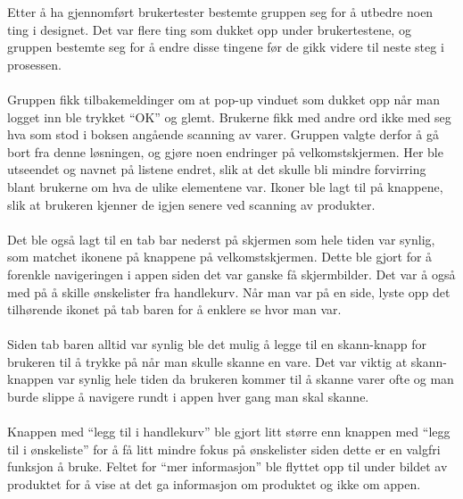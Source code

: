 Etter å ha gjennomført brukertester bestemte gruppen seg for å utbedre noen ting i designet. Det var flere ting som dukket opp under brukertestene, og gruppen bestemte seg for å endre disse tingene før de gikk videre til neste steg i prosessen.
\\\\
Gruppen fikk tilbakemeldinger om at pop-up vinduet som dukket opp når man logget inn ble trykket “OK” og glemt. Brukerne fikk med andre ord ikke med seg hva som stod i boksen angående scanning av varer. Gruppen valgte derfor å gå bort fra denne løsningen, og gjøre noen endringer på velkomstskjermen. Her ble utseendet og navnet på listene endret, slik at det skulle bli mindre forvirring blant brukerne om hva de ulike elementene var. Ikoner ble lagt til på knappene, slik at brukeren kjenner de igjen senere ved scanning av produkter. 
\\\\
Det ble også lagt til en tab bar nederst på skjermen som hele tiden var synlig, som matchet ikonene på knappene på velkomstskjermen. Dette ble gjort for å forenkle navigeringen i appen siden det var ganske få skjermbilder. Det var å også med på å skille ønskelister fra handlekurv. Når man var på en side, lyste opp det tilhørende ikonet på tab baren for å enklere se hvor man var. 
\\\\
Siden tab baren alltid var synlig ble det mulig å legge til en skann-knapp for brukeren til å trykke på når man skulle skanne en vare. Det var viktig at skann-knappen var synlig hele tiden da brukeren kommer til å skanne varer ofte og man burde slippe å navigere rundt i appen hver gang man skal skanne. 
\\\\
Knappen med “legg til i handlekurv” ble gjort litt større enn knappen med “legg til i ønskeliste” for å få litt mindre fokus på ønskelister siden dette er en valgfri funksjon å bruke. Feltet for “mer informasjon” ble flyttet opp til under bildet av produktet for å vise at det ga informasjon om produktet og ikke om appen. 

